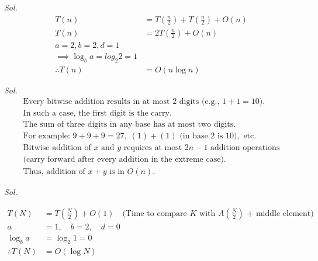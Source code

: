 
\textit{ Sol. }
\begin{align*}
	T(n)            & = T(\frac{n}{2}) + T(\frac{n}{2}) + O(n) \\
	T(n)            & = 2T(\frac{n}{2}) + O(n)                 \\
	a = 2, b = 2, d = 1                                        \\
	\implies \log_b a = log_2 2 = 1                            \\
	\therefore T(n) & = O(n{\log n})
\end{align*}


\textit{ Sol. }
\begin{align*}
	\text{Every bitwise addition results in at most 2 digits (e.g., } 1 + 1 = 10 \text{).}                    \\
	\text{In such a case, the first digit is the carry.}                                                      \\
	\text{The sum of three digits in any base has at most two digits.}                                        \\
	\text{For example: } 9 + 9 + 9 = 27, \; (1) + (1) \text{ (in base } 2 \text{ is } 10), \text{ etc.}       \\
	\text{Bitwise addition of } x \text{ and } y \text{ requires at most } 2n - 1 \text{ addition operations} \\
	\text{(carry forward after every addition in the extreme case).}                                          \\
	\text{Thus, addition of } x + y \text{ is in } O(n).
\end{align*}


\textit{ Sol. }

\begin{align*}
	T(N)            & = T\left(\frac{N}{2}\right) + O(1) \quad \text{(Time to compare $K$ with $A\left(\frac{N}{2}\right)$ + middle element)} \\
	a               & = 1, \quad b = 2, \quad d = 0                                                                                           \\
	\log_b a        & = \log_2 1 = 0                                                                                                          \\
	\therefore T(N) & = O(\log N)
\end{align*}

